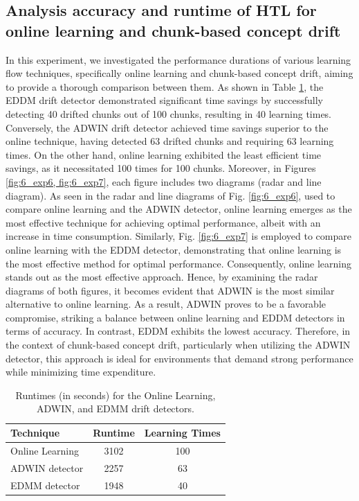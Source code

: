 \subsection{Analysis accuracy and runtime of HTL for online learning and chunk-based concept drift}
In this experiment, we investigated the performance durations of various learning flow techniques, specifically online learning and chunk-based concept drift, aiming to provide a thorough comparison between them. As shown in Table \ref{table:6_table4}, the EDDM drift detector demonstrated significant time savings by successfully detecting 40 drifted chunks out of 100 chunks, resulting in 40 learning times. Conversely, the ADWIN drift detector achieved time savings superior to the online technique, having detected 63 drifted chunks and requiring 63 learning times. On the other hand, online learning exhibited the least efficient time savings, as it necessitated 100 times for 100 chunks. Moreover, in Figures \ref{fig:6_exp6, fig:6_exp7}, each figure includes two diagrams (radar and line diagram). As seen in the radar and line diagrams of Fig. \ref{fig:6_exp6}, used to compare online learning and the ADWIN detector, online learning emerges as the most effective technique for achieving optimal performance, albeit with an increase in time consumption. Similarly, Fig. \ref{fig:6_exp7} is employed to compare online learning with the EDDM detector, demonstrating that online learning is the most effective method for optimal performance. Consequently, online learning stands out as the most effective approach. Hence, by examining the radar diagrams of both figures, it becomes evident that ADWIN is the most similar alternative to online learning. As a result, ADWIN proves to be a favorable compromise, striking a balance between online learning and EDDM detectors in terms of accuracy. In contrast, EDDM exhibits the lowest accuracy. Therefore, in the context of chunk-based concept drift, particularly when utilizing the ADWIN detector, this approach is ideal for environments that demand strong performance while minimizing time expenditure.

\begin{table}[h]
  \centering
  \begin{tabular}{|l|c|c|}
  \hline
  \textbf{Technique}       & \textbf{Runtime} & \textbf{Learning Times} \\ \hline
  Online Learning          & 3102             & 100                     \\ \hline
  ADWIN detector           & 2257             & 63                      \\ \hline
  EDMM detector            & 1948             & 40                      \\ \hline
  \end{tabular}
  \caption{Runtimes (in seconds) for the Online Learning, ADWIN, and EDMM drift detectors.}
  \label{table:6_table4}
  \end{table}
  
